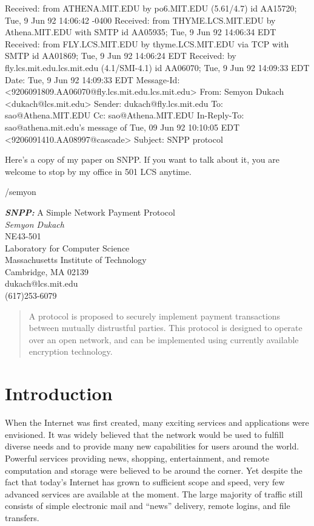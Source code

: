 Received: from ATHENA.MIT.EDU by po6.MIT.EDU (5.61/4.7) id AA15720; Tue, 9 Jun 92 14:06:42 -0400
Received: from THYME.LCS.MIT.EDU by Athena.MIT.EDU with SMTP
	id AA05935; Tue, 9 Jun 92 14:06:34 EDT
Received: from FLY.LCS.MIT.EDU by thyme.LCS.MIT.EDU via TCP with SMTP
	id AA01869; Tue, 9 Jun 92 14:06:24 EDT
Received: by fly.lcs.mit.edu.lcs.mit.edu (4.1/SMI-4.1)
	id AA06070; Tue, 9 Jun 92 14:09:33 EDT
Date: Tue, 9 Jun 92 14:09:33 EDT
Message-Id: <9206091809.AA06070@fly.lcs.mit.edu.lcs.mit.edu>
From: Semyon Dukach <dukach@lcs.mit.edu>
Sender: dukach@fly.lcs.mit.edu
To: sao@Athena.MIT.EDU
Cc: sao@Athena.MIT.EDU
In-Reply-To: sao@athena.mit.edu's message of Tue, 09 Jun 92 10:10:05 EDT <9206091410.AA08997@cascade>
Subject: SNPP protocol

Here's a copy of my paper on SNPP.  If you want to talk about it, you are
welcome to stop by my office in 501 LCS anytime.

/semyon



\begin{center}
{\large {\em \bf SNPP:} A Simple Network Payment Protocol \\}
\bigskip
\bigskip
{\em Semyon Dukach\\}
\bigskip
NE43-501\\
Laboratory for Computer Science\\
Massachusetts Institute of Technology\\
Cambridge, MA 02139\\
dukach@lcs.mit.edu\\
(617)253-6079\\
\end{center}

\bigskip
\bigskip

\begin{abstract}
A protocol is proposed to securely implement payment transactions
between mutually distrustful parties.  This protocol is designed to
operate over an open network, and can be implemented using currently
available encryption technology.
\end{abstract}

\section{Introduction}

When the Internet was first created, many exciting services and
applications were envisioned.  It was widely believed that the network
would be used to fulfill diverse needs and to provide many new
capabilities for users around the world.  Powerful services providing
news, shopping, entertainment, and remote computation and storage were
believed to be around the corner.  Yet despite the fact that today's Internet
has grown to sufficient scope and speed, very few advanced services are
available at the moment.  The large majority of traffic still consists of
simple electronic mail and ``news'' delivery, remote logins, and file
transfers.

